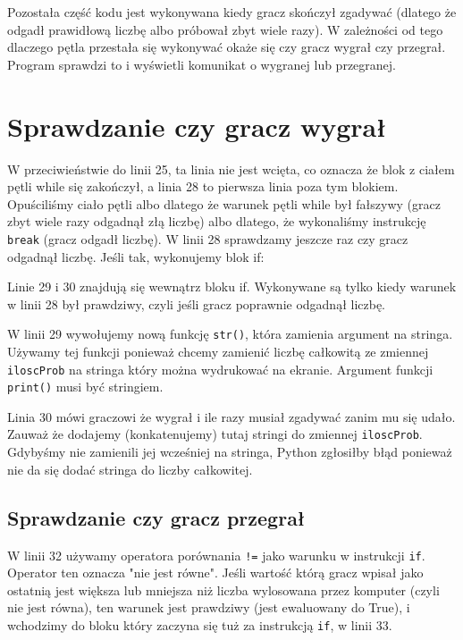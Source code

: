 \documentclass{book}
\begin{document}
Pozostała część kodu jest wykonywana kiedy gracz skończył zgadywać (dlatego że odgadł prawidłową liczbę albo próbował zbyt wiele razy). W zależności od tego dlaczego pętla przestała się wykonywać okaże się czy gracz wygrał czy przegrał. Program sprawdzi to i wyświetli komunikat o wygranej lub przegranej.

\section{Sprawdzanie czy gracz wygrał}



W przeciwieństwie do linii 25, ta linia nie jest wcięta, co oznacza że blok z ciałem pętli while się zakończył, a linia 28 to pierwsza linia poza tym blokiem. Opuściliśmy ciało pętli albo dlatego że warunek pętli while był fałszywy (gracz zbyt wiele razy odgadnął złą liczbę) albo dlatego, że wykonaliśmy instrukcję \lstinline{break} (gracz odgadł liczbę). W linii 28 sprawdzamy jeszcze raz czy gracz odgadnął liczbę. Jeśli tak, wykonujemy blok if:



Linie 29 i 30 znajdują się wewnątrz bloku if. Wykonywane są tylko kiedy warunek w linii 28 był prawdziwy, czyli jeśli gracz poprawnie odgadnął liczbę.

W linii 29 wywołujemy nową funkcję \lstinline{str()}, która zamienia argument na stringa. Używamy tej funkcji ponieważ chcemy zamienić liczbę całkowitą ze zmiennej \lstinline{iloscProb} na stringa który można wydrukować na ekranie. Argument funkcji \lstinline{print()} musi być stringiem.

Linia 30 mówi graczowi że wygrał i ile razy musiał zgadywać zanim mu się udało. Zauważ że dodajemy (konkatenujemy) tutaj stringi do zmiennej \lstinline{iloscProb}. Gdybyśmy nie zamienili jej wcześniej na stringa, Python zgłosiłby błąd ponieważ nie da się dodać stringa do liczby całkowitej.

\subsection{Sprawdzanie czy gracz przegrał}



W linii 32 używamy operatora porównania \lstinline{!=} jako warunku w instrukcji \lstinline{if}. Operator ten oznacza "nie jest równe". Jeśli wartość którą gracz wpisał jako ostatnią jest większa lub mniejsza niż liczba wylosowana przez komputer (czyli nie jest równa), ten warunek jest prawdziwy (jest ewaluowany do True), i wchodzimy do bloku który zaczyna się tuż za instrukcją \lstinline{if}, w linii 33.
\end{document}
